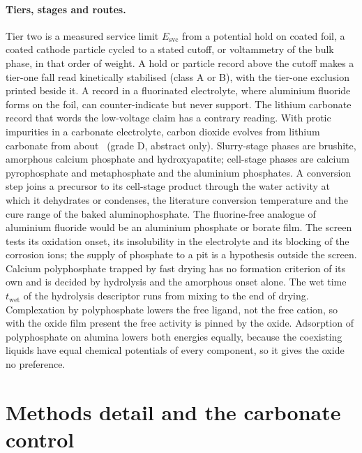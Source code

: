 \paragraph*{Tiers, stages and routes.}
Tier two is a measured service limit $E_\mathrm{svc}$ from a potential hold on coated foil, a coated cathode particle cycled to a stated cutoff, or voltammetry of the bulk phase, in that order of weight. %
A hold or particle record above the cutoff makes a tier-one fall read kinetically stabilised (class A or B), with the tier-one exclusion printed beside it. %
A record in a fluorinated electrolyte, where aluminium fluoride forms on the foil, can counter-indicate but never support. %
The lithium carbonate record that words the low-voltage claim has a contrary reading. %
With protic impurities in a carbonate electrolyte, carbon dioxide evolves from lithium carbonate from about \NumTierTwoContrary\ (grade D, abstract only)\cite{freiberg2020li2co3}. %
Slurry-stage phases are brushite, amorphous calcium phosphate and hydroxyapatite; cell-stage phases are calcium pyrophosphate and metaphosphate and the aluminium phosphates. %
A conversion step joins a precursor to its cell-stage product through the water activity at which it dehydrates or condenses, the literature conversion temperature and the cure range of the baked aluminophosphate. %
The fluorine-free analogue of aluminium fluoride would be an aluminium phosphate or borate film. %
The screen tests its oxidation onset, its insolubility in the electrolyte and its blocking of the corrosion ions; the supply of phosphate to a pit is a hypothesis outside the screen. %
Calcium polyphosphate trapped by fast drying has no formation criterion of its own and is decided by hydrolysis and the amorphous onset alone. %
The wet time $t_\mathrm{wet}$ of the hydrolysis descriptor runs from mixing to the end of drying. %
Complexation by polyphosphate lowers the free ligand, not the free cation, so with the oxide film present the free  activity is pinned by the oxide. %
Adsorption of polyphosphate on alumina lowers both energies equally, because the coexisting liquids have equal chemical potentials of every component, so it gives the oxide no preference. %

\section{Methods detail and the carbonate control}\label{si:methods}
